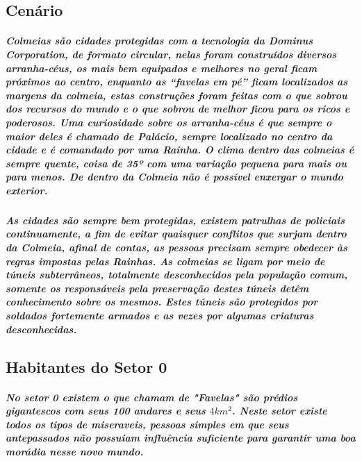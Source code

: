\newpage
\begin{multicols}{2}

\subsection{\bf Cenário}
\subparagraph*{Colmeias são cidades protegidas com a tecnologia da Dominus Corporation, de formato circular, nelas foram construídos diversos arranha-céus, os mais bem equipados e melhores no geral ficam próximos ao centro, enquanto as “favelas em pé” ficam localizados as margens da colmeia, estas construções foram feitas com o que sobrou dos recursos do mundo e o que sobrou de melhor ficou para os ricos e poderosos. Uma curiosidade sobre os arranha-céus é que sempre o maior deles é chamado de Palácio, sempre localizado no centro da cidade e é comandado por uma Rainha. O clima dentro das colmeias é sempre quente, coisa de 35º com uma variação pequena para mais ou para menos. De dentro da Colmeia não é possível enxergar o mundo exterior.}

\subparagraph*{As cidades são sempre bem protegidas, existem patrulhas de policiais continuamente, a fim de evitar quaisquer conflitos que surjam dentro da Colmeia, afinal de contas, as pessoas precisam sempre obedecer às regras impostas pelas Rainhas.
As colmeias se ligam por meio de túneis subterrâneos, totalmente desconhecidos pela população comum, somente os responsáveis pela preservação destes túneis detêm conhecimento sobre os mesmos. Estes túneis são protegidos por soldados fortemente armados e as vezes por algumas criaturas desconhecidas.}
 
\subsection{\bf Habitantes do Setor 0}
\subparagraph*{No setor 0 existem o que chamam de "Favelas" são prédios gigantescos com seus 100 andares e seus $4km^2$. Neste setor existe todos os tipos de miseraveis, pessoas simples em que seus antepassados não possuiam influência suficiente para garantir uma boa morádia nesse novo mundo.}
\preencher


\end{multicols}
